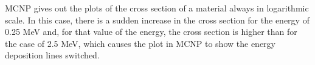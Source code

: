 MCNP gives out the plots of the cross section of a material always in logarithmic scale. In this case, there is a sudden increase in the cross section for the energy of 0.25 \unit{\mega\electronvolt} and, for that value of the energy, the cross section is higher than for the case of 2.5 \unit{\mega\electronvolt}, which causes the plot in MCNP to show the energy deposition lines switched. 
